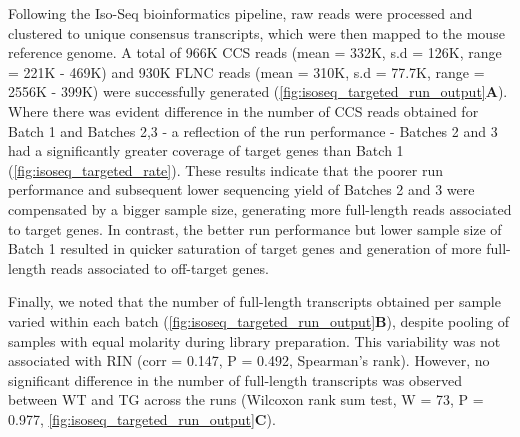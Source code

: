 Following the Iso-Seq bioinformatics pipeline, raw reads were processed and clustered to unique consensus transcripts, which were then mapped to the mouse reference genome. A total of 966K CCS reads (mean = 332K, s.d = 126K, range =  221K - 469K) and 930K FLNC reads (mean = 310K, s.d = 77.7K, range = 2556K - 399K) were successfully generated (\cref{fig:isoseq_targeted_run_output}\textbf{A}). Where there was evident difference in the number of CCS reads obtained for Batch 1 and Batches 2,3 - a reflection of the run performance - Batches 2 and 3 had a significantly greater coverage of target genes than Batch 1 (\cref{fig:isoseq_targeted_rate}). These results indicate that the poorer run performance and subsequent lower sequencing yield of Batches 2 and 3 were compensated by a bigger sample size, generating more full-length reads associated to target genes. In contrast, the better run performance but lower sample size of Batch 1 resulted in quicker saturation of target genes and generation of more full-length reads associated to off-target genes. 

Finally, we noted that the number of full-length transcripts obtained per sample varied within each batch (\cref{fig:isoseq_targeted_run_output}\textbf{B}), despite pooling of samples with equal molarity during library preparation. This variability was not associated with RIN (corr = 0.147, P = 0.492, Spearman's rank). However, no significant difference in the number of full-length transcripts was observed between WT and TG across the runs (Wilcoxon rank sum test, W = 73, P = 0.977, \cref{fig:isoseq_targeted_run_output}\textbf{C}). 


